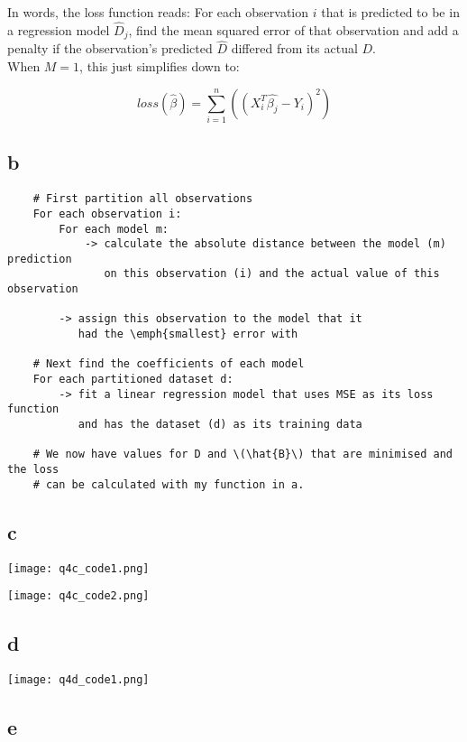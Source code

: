 \documentclass{article}
\begin{document}
In words, the loss function reads: For each observation \(i\) that is predicted to be in a regression model \(\hat{D}_{j}\), find the mean
squared error of that observation and add a penalty if the observation's predicted \(\hat{D}\) differed from its actual \(D\).\\

When \(M = 1\), this just simplifies down to:

\[
    loss(\hat{\beta}) = \sum_{i=1}^{n}(
            (X_{i}^{T} \hat{\beta_{j}} - Y_{i})^{2}
    )
\]

\subsection*{b}

\begin{verbatim}
    # First partition all observations
    For each observation i:
        For each model m:
            -> calculate the absolute distance between the model (m) prediction
               on this observation (i) and the actual value of this observation

        -> assign this observation to the model that it 
           had the \emph{smallest} error with

    # Next find the coefficients of each model
    For each partitioned dataset d:
        -> fit a linear regression model that uses MSE as its loss function
           and has the dataset (d) as its training data

    # We now have values for D and \(\hat{B}\) that are minimised and the loss
    # can be calculated with my function in a.

\end{verbatim}

\subsection*{c}

\texttt{[image: q4c\_code1.png]}

\texttt{[image: q4c\_code2.png]}

\subsection*{d}

\texttt{[image: q4d\_code1.png]}

\newpage
\subsection*{e}
\end{document}
